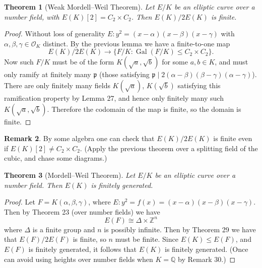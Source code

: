 \documentclass[a4paper]{article}
\newtheorem{theorem}{Theorem}
\theoremstyle{definition}
\newtheorem{numberremark}[theorem]{Remark}
\DeclareMathOperator{\Gal}{Gal}
\newcommand{\p}{\mathfrak{p}}
\renewcommand{\O}{\mathcal{O}}
\newcommand{\Z}{\mathbb{Z}}
\newcommand{\Q}{\mathbb{Q}}
\begin{document}
\begin{theorem}[Weak Mordell--Weil Theorem]
    Let $E/K$ be an elliptic curve over a number field, with
    $E(K)[2]=C_2\times C_2$. Then $E(K)/2E(K)$ is finite.
\end{theorem}

\begin{proof}
    Without loss of generality $E:y^2=(x-\alpha)(x-\beta)(x-\gamma)$ with
    $\alpha,\beta,\gamma\in\O_K$ distinct. By the previous lemma we have a
    finite-to-one map
    \begin{equation*}
        E(K)/2E(K) \to \{F/K:\Gal(F/K)\le C_2\times C_2\}.
    \end{equation*}
    Now such $F/K$ must be of the form $K(\sqrt a,\sqrt b)$ for some $a,b\in K$,
    and must only ramify at finitely many $\p$ (those satisfying
    $\p\mid2(\alpha-\beta)(\beta-\gamma)(\alpha-\gamma)$). There are only
    finitely many fields $K(\sqrt a)$, $K(\sqrt b)$ satisfying this ramification
    property by Lemma 27, and hence only finitely many such
    $K(\sqrt a,\sqrt b)$. Therefore the codomain of the map is finite, so the
    domain is finite.
\end{proof}

\begin{numberremark}
    By some algebra one can check that $E(K)/2E(K)$ is finite even if
    $E(K)[2]\ne C_2\times C_2$. (Apply the previous theorem over a splitting
    field of the cubic, and chase some diagrams.)
\end{numberremark}

\begin{theorem}[Mordell--Weil Theorem]
    Let $E/K$ be an elliptic curve over a number field. Then $E(K)$ is
    finitely generated.
\end{theorem}

\begin{proof}
    Let $F=K(\alpha,\beta,\gamma)$, where
    $E:y^2=f(x)=(x-\alpha)(x-\beta)(x-\gamma)$. Then by Theorem 23 (over number
    fields) we have
    \begin{equation*}
        E(F) \cong \Delta\times\Z^n
    \end{equation*}
    where $\Delta$ is a finite group and $n$ is possibly infinite. Then by
    Theorem 29 we have that $E(F)/2E(F)$ is finite, so $n$ must be finite.
    Since $E(K)\le E(F)$, and $E(F)$ is finitely generated, it follows that
    $E(K)$ is finitely generated. (Once can avoid using heights over number
    fields when $K=\Q$ by Remark 30.)
\end{proof}
\end{document}
